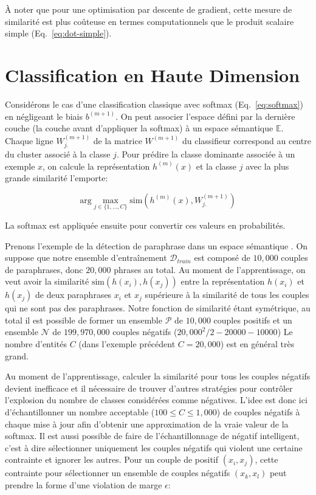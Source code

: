 À noter que pour une optimisation par descente de gradient, cette mesure de
similarité est plus coûteuse en termes computationnels que le produit scalaire
simple (Eq.~\ref{eq:dot-simple}).

\section{Classification en Haute Dimension}
\label{sec:chd}

Considérons le cas d'une classification classique avec softmax
(Eq.~\ref{eq:softmax}) en négligeant le biais $b^{(m+1)}$. On peut associer
l'espace défini par la dernière couche (la couche avant d'appliquer la softmax)
à un espace sémantique $\mathbb{E}$.  Chaque ligne $W^{(m+1)}_{j.}$ de la
matrice $W^{(m+1)}$ du classifieur correspond au centre du cluster associé à
la classe $j$. Pour prédire la classe dominante associée à un exemple $x$, on
calcule la représentation $h^{(m)}(x)$ et la classe $j$ avec la plus grande
similarité l'emporte:

\begin{equation}
\textrm{arg}\max_{j\in\lbrace 1,\dots ,C\rbrace} \textrm{sim}(h^{(m)}(x), W^{(m+1)}_{j.})
\end{equation}

La softmax est appliquée ensuite pour convertir ces valeurs en probabilités.

Prenons l'exemple de la détection de paraphrase dans un espace sémantique
\citep{msr-paraphrase}. On suppose que notre ensemble d'entraînement
$\mathcal{D}_{train}$ est composé de $10,000$ couples de paraphrases, donc
$20,000$ phrases au total. Au moment de l'apprentissage, on veut avoir la similarité
$\textrm{sim}(h(x_i),h(x_j))$ entre la représentation $h(x_i)$ et $h(x_j)$ de
deux paraphrases $x_i$ et $x_j$ supérieure à la similarité de tous les couples
qui ne sont pas des paraphrases. Notre fonction de similarité étant symétrique,
au total il est possible de former un ensemble $\mathcal{P}$ de $10,000$
couples positifs et un ensemble $\mathcal{N}$ de $199,970,000$ couples négatifs
($20,000^2/2 - 20000 - 10000$) Le nombre d'entités $C$ (dans l'exemple
précédent $C=20,000$) est en général très grand.

Au moment de l'apprentissage, calculer la similarité pour tous les couples
négatifs devient inefficace et il nécessaire de trouver d'autres stratégies
pour contrôler l'explosion du nombre de classes considérées comme négatives.
L'idee est donc ici d'échantillonner un nombre acceptable ($100\leq C\leq 1,000$) de couples négatifs à chaque
mise à jour afin d'obtenir une approximation de la vraie valeur de la softmax.
Il est aussi possible de faire de l'échantillonnage de négatif intelligent, c'est à dire
sélectionner uniquement les couples négatifs qui violent une certaine
contrainte et ignorer les autres. Pour un couple de positif $(x_i, x_j)$, cette
contrainte pour sélectionner un ensemble de couples négatifs $(x_k, x_l)$ peut
prendre la forme d'une violation de marge $\epsilon$:

